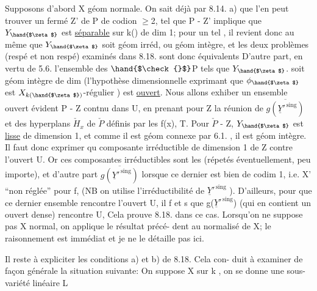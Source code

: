 

Supposons d'abord X géom normale. On sait déjà par 8.14. a)  que
l'en  peut trouver un fermé Z' de P de codion $\geq$2, tel que
\hand{$\zeta\in$} P - Z'  implique que  $Y_{\hand{$\zeta$}}$  est  \uline{séparable} sur k(\hand{$\zeta$}) de  dim 1; pour
un tel \hand{$\zeta$} , il revient donc au même que $Y_{\hand{$\zeta$}}$ soit géom irréd, ou géom
intègre, et  les deux problèmes  (respé et non respé) examinés dans
8.18. sont donc équivalents D'autre part, en vertu de 5.6. l'ensemble
 des \hand{$\zeta\in$} $\hand{$\check{}$}$P  tels que  $Y_{\hand{$\zeta$}}$.  soit géom intègre de dim  (l'hypothèse
dimensionnelle exprimant que $\phi_{\hand{$\zeta$}}$ est $X_{k(\hand{$\zeta$})}$-régulier ) est \uline{ouvert}.
Nous allons exhiber un ensemble ouvert  évident  P - Z  contnu dans U,
en prenant pour  Z la réunion de  $\overline{g(\underline{Y}'^{\,\mathrm{sing}})}$  et des hyperplans $\check{H}_x$
de $\check{P}$  définis par les  f(x),  T.  Pour \hand{$\zeta\in$} $\check{P}$ - Z,  $Y_{\hand{$\zeta$}}$  est \uline{lisse}
de dimension 1, et comme il est géom connexe par 6.1. , il est géom
intègre.  Il faut donc  exprimer qu  composante irréductible
de dimension  1 de Z  contre l'ouvert U.  Or ces composantes
irréductibles sont les    (répetés éventuellement, peu importe), et
d'autre part $\overline{g(\underline{Y}'^{\,\mathrm{sing}})}$  lorsque  ce dernier  est bien de codim 1, i.e.
X' ``non réglée'' pour f, (NB on utilise l'irréductibilité de  $\underline{Y}'^{\,\mathrm{sing}}$ ).
D'ailleurs, pour que ce dernier ensemble rencontre  l'ouvert U,
il f et s  que  g($\underline{Y}'^{\,\mathrm{sing}}$)  (qui en contient un ouvert dense) rencontre
U,  Cela prouve 8.18. dans ce
cas.  Lorsqu'on ne suppose pas X normal, on applique le résultat précé-%
dent au normalisé de X; le raisonnement est immédiat et je ne le détaille
pas ici.  

Il reste à expliciter  les conditions a) et b) de 8.18. Cela con-%
duit à examiner de façon générale la situation suivante:  On suppose
X  sur k , on se donne une sous-variété linéaire  L 


